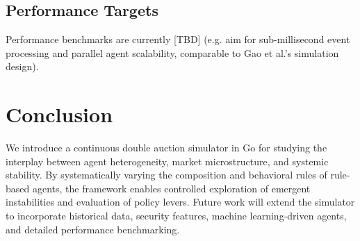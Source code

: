\documentclass[conference, 12pt]{IEEEtran}
\begin{document}
\subsection{Performance Targets}
Performance benchmarks are currently [TBD] (e.g. aim for sub-millisecond event processing and parallel agent scalability, comparable to Gao et al.'s simulation design).




\section{Conclusion}
We introduce a continuous double auction simulator in Go for studying the interplay between agent heterogeneity, market microstructure, and systemic stability. By systematically varying the composition and behavioral rules of rule-based agents, the framework enables controlled exploration of emergent instabilities and evaluation of policy levers. Future work will extend the simulator to incorporate historical data, security features, machine learning-driven agents, and detailed performance benchmarking.



\newpage
{\small


}
\end{document}
